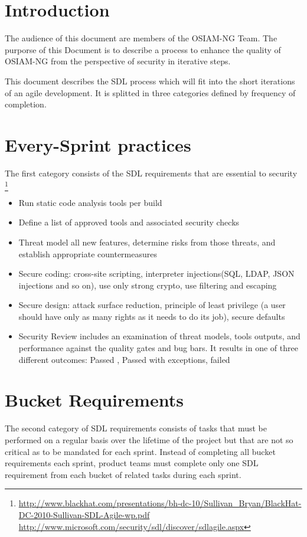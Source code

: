 \section{Introduction}

The audience of this document are members of the OSIAM-NG Team.
The purporse of this Document is to describe a process to enhance the quality of
OSIAM-NG from the perspective of security in iterative steps.

This document describes the SDL process which will fit into the short iterations of an agile development. It is splitted in three categories defined by frequency of completion.

\section{ Every-Sprint practices}

The first category consists of the SDL requirements that are essential to security \footnote{\url{http://www.blackhat.com/presentations/bh-dc-10/Sullivan_Bryan/BlackHat-DC-2010-Sullivan-SDL-Agile-wp.pdf} \url{http://www.microsoft.com/security/sdl/discover/sdlagile.aspx}}

\begin{itemize}
	\item Run static code analysis tools per build
	\item Define a list of approved tools and associated security checks
	\item Threat model all new features, determine risks from those threats, and establish appropriate countermeasures 
	\item Secure coding: cross-site scripting, interpreter injections(SQL, LDAP, JSON injections and so on), use only strong crypto, use filtering and escaping
	\item Secure design: attack surface reduction, principle of least privilege (a user should have only as many rights as it needs to do its job), secure defaults	
	\item Security Review includes an examination of threat models, tools outputs, and performance against the quality gates and bug bars. It results in one of three different outcomes: Passed , Passed with exceptions, failed  
\end{itemize}

\section{Bucket Requirements}
The second category of SDL requirements consists of tasks that must be performed on a regular basis over the lifetime of the project but that are not so critical as to be mandated for each sprint.
Instead of completing all bucket requirements each sprint, product teams must complete only one SDL requirement from each bucket of related tasks during each sprint.

